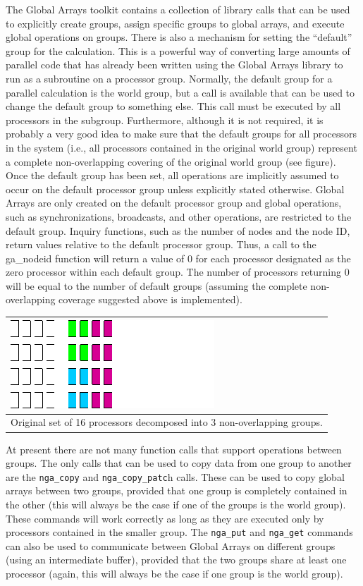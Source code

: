 The Global Arrays toolkit contains a collection of library calls that
can be used to explicitly create groups, assign specific groups to
global arrays, and execute global operations on groups. There is also
a mechanism for setting the \textquotedblleft{}default\textquotedblright{}
group for the calculation. This is a powerful way of converting large
amounts of parallel code that has already been written using the Global
Arrays library to run as a subroutine on a processor group. Normally,
the default group for a parallel calculation is the world group, but
a call is available that can be used to change the default group to
something else. This call must be executed by all processors in the
subgroup. Furthermore, although it is not required, it is probably
a very good idea to make sure that the default groups for all processors
in the system (i.e., all processors contained in the original world
group) represent a complete non-overlapping covering of the original
world group (see figure). Once the default group has been set, all
operations are implicitly assumed to occur on the default processor
group unless explicitly stated otherwise. Global Arrays are only created
on the default processor group and global operations, such as synchronizations,
broadcasts, and other operations, are restricted to the default group.
Inquiry functions, such as the number of nodes and the node ID, return
values relative to the default processor group. Thus, a call to the
ga\_nodeid function will return a value of 0 for each processor designated
as the zero processor within each default group. The number of processors
returning 0 will be equal to the number of default groups (assuming
the complete non-overlapping coverage suggested above is implemented).

\begin{tabular}{|>{\centering}p{10cm}|}
\hline 
\includegraphics{groups}\tabularnewline
\hline
\hline 
Original set of 16 processors decomposed into 3 non-overlapping groups.\tabularnewline
\hline
\end{tabular}

At present there are not many function calls that support operations
between groups. The only calls that can be used to copy data from
one group to another are the \texttt{nga\_copy} and \texttt{nga\_copy\_patc}h
calls. These can be used to copy global arrays between two groups,
provided that one group is completely contained in the other (this
will always be the case if one of the groups is the world group).
These commands will work correctly as long as they are executed only
by processors contained in the smaller group. The \texttt{nga\_put}
and \texttt{nga\_get} commands can also be used to communicate between
Global Arrays on different groups (using an intermediate buffer),
provided that the two groups share at least one processor (again,
this will always be the case if one group is the world group).

